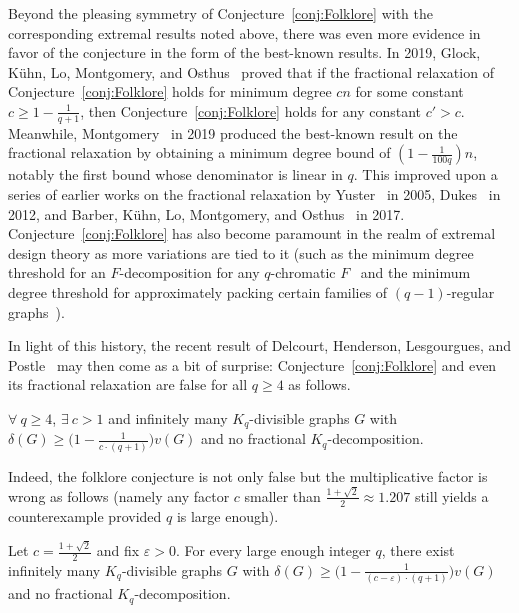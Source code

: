 \documentclass[twoside,leqno]{article}
\begin{document}
Beyond the pleasing symmetry of Conjecture~\ref{conj:Folklore} with the corresponding extremal results noted above, there was even more evidence in favor of the conjecture in the form of the best-known results. %
In 2019, Glock, K\"{u}hn, Lo, Montgomery, and Osthus~\cite{GKLMO19} proved that if the fractional relaxation of Conjecture~\ref{conj:Folklore} holds for minimum degree $cn$ for some constant $c\ge 1-\frac{1}{q+1}$, then Conjecture~\ref{conj:Folklore} holds for any constant $c' > c$.  Meanwhile, Montgomery~\cite{montgomery_fractional_2019} in 2019 produced the best-known result on the fractional relaxation by obtaining a minimum degree bound of $(1-\frac{1}{100q})n$, notably the first bound whose denominator is linear in $q$. This improved upon a series of earlier works on the fractional relaxation by Yuster~\cite{Yuster2005asymptotically} in 2005, Dukes~\cite{D12} in 2012, and Barber, K\"{u}hn, Lo, Montgomery, and Osthus~\cite{BKLMO17} in 2017. Conjecture~\ref{conj:Folklore} has also become paramount in the realm of extremal design theory as more variations are tied to it (such as the minimum degree threshold for an $F$-decomposition for any $q$-chromatic $F$~\cite{GKLMO19} and the minimum degree threshold for approximately packing certain families of $(q-1)$-regular graphs~\cite{CKKO19}).  

In light of this history, the recent result of Delcourt, Henderson, Lesgourgues, and Postle~\cite{DHLP25b} may then come as a bit of surprise: Conjecture~\ref{conj:Folklore} and even its fractional relaxation are false for all $q\ge 4$ as follows.

\begin{thm}\label{thm:mainExistence}
$\forall~q\geq 4$, $\exists~c>1$ and infinitely many $K_q$-divisible graphs $G$ with $\delta(G)\ge \big(1-\frac{1}{c\cdot (q+1)}\big)v(G)$ and no fractional $K_q$-decomposition.
\end{thm}

Indeed, the folklore conjecture is not only false but the multiplicative factor is wrong as follows (namely any factor $c$ smaller than $\frac{1+\sqrt{2}}{2}\approx 1.207$ still yields a counterexample provided $q$ is large enough).

\begin{thm}\label{thm:mainAsymptotic}
    Let $c=\frac{1+\sqrt{2}}{2}$ and fix $\varepsilon>0$. For every large enough integer $q$, there exist infinitely many $K_q$-divisible graphs $G$ with $\delta(G)\ge \big(1-\frac{1}{(c-\varepsilon)\cdot (q+1)}\big)v(G)$ and no fractional $K_q$-decomposition.
\end{thm}
\end{document}
